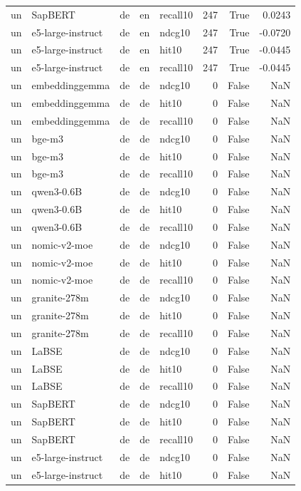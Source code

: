 \begin{tabular}{lllllrrr}
un & SapBERT & de & en & recall10 & 247 & True & 0.0243 \\
un & e5-large-instruct & de & en & ndcg10 & 247 & True & -0.0720 \\
un & e5-large-instruct & de & en & hit10 & 247 & True & -0.0445 \\
un & e5-large-instruct & de & en & recall10 & 247 & True & -0.0445 \\
un & embeddinggemma & de & de & ndcg10 & 0 & False & NaN \\
un & embeddinggemma & de & de & hit10 & 0 & False & NaN \\
un & embeddinggemma & de & de & recall10 & 0 & False & NaN \\
un & bge-m3 & de & de & ndcg10 & 0 & False & NaN \\
un & bge-m3 & de & de & hit10 & 0 & False & NaN \\
un & bge-m3 & de & de & recall10 & 0 & False & NaN \\
un & qwen3-0.6B & de & de & ndcg10 & 0 & False & NaN \\
un & qwen3-0.6B & de & de & hit10 & 0 & False & NaN \\
un & qwen3-0.6B & de & de & recall10 & 0 & False & NaN \\
un & nomic-v2-moe & de & de & ndcg10 & 0 & False & NaN \\
un & nomic-v2-moe & de & de & hit10 & 0 & False & NaN \\
un & nomic-v2-moe & de & de & recall10 & 0 & False & NaN \\
un & granite-278m & de & de & ndcg10 & 0 & False & NaN \\
un & granite-278m & de & de & hit10 & 0 & False & NaN \\
un & granite-278m & de & de & recall10 & 0 & False & NaN \\
un & LaBSE & de & de & ndcg10 & 0 & False & NaN \\
un & LaBSE & de & de & hit10 & 0 & False & NaN \\
un & LaBSE & de & de & recall10 & 0 & False & NaN \\
un & SapBERT & de & de & ndcg10 & 0 & False & NaN \\
un & SapBERT & de & de & hit10 & 0 & False & NaN \\
un & SapBERT & de & de & recall10 & 0 & False & NaN \\
un & e5-large-instruct & de & de & ndcg10 & 0 & False & NaN \\
un & e5-large-instruct & de & de & hit10 & 0 & False & NaN \\

\end{tabular}
